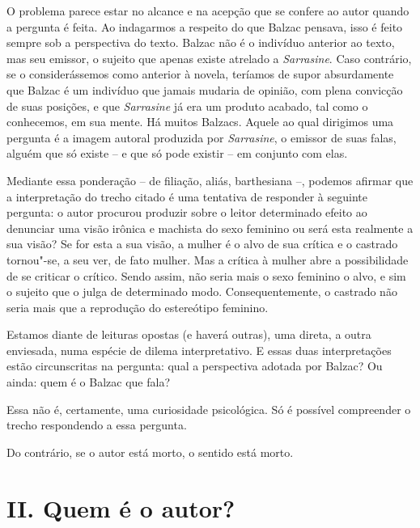 O problema parece estar no alcance e na acepção que se confere ao autor
quando a pergunta é feita. Ao indagarmos a respeito do que Balzac
pensava, isso é feito sempre sob a perspectiva do texto. Balzac não é o
indivíduo anterior ao texto, mas seu emissor, o sujeito que apenas
existe atrelado a \emph{Sarrasine}. Caso contrário, se o considerássemos como
anterior à novela, teríamos de supor absurdamente que Balzac é um
indivíduo que jamais mudaria de opinião, com plena convicção de suas
posições, e que \emph{Sarrasine} já era um produto acabado, tal como o
conhecemos, em sua mente. Há muitos Balzacs. Aquele ao qual dirigimos
uma pergunta é a imagem autoral produzida por \emph{Sarrasine}, o emissor de
suas falas, alguém que só existe -- e que só pode existir -- em conjunto
com elas.

Mediante essa ponderação -- de filiação, aliás, barthesiana --, podemos
afirmar que a interpretação do trecho citado é uma tentativa de
responder à seguinte pergunta: o autor procurou produzir sobre o leitor
determinado efeito ao denunciar uma visão irônica e machista do sexo
feminino ou será esta realmente a sua visão? Se for esta a sua visão, a
mulher é o alvo de sua crítica e o castrado tornou"-se, a seu ver, de
fato mulher. Mas a crítica à mulher abre a possibilidade de se criticar
o crítico. Sendo assim, não seria mais o sexo feminino o alvo, e sim o
sujeito que o julga de determinado modo. Consequentemente, o castrado
não seria mais que a reprodução do estereótipo feminino.

Estamos diante de leituras opostas (e haverá outras), uma direta, a
outra enviesada, numa espécie de dilema interpretativo. E essas duas
interpretações estão circunscritas na pergunta: qual a perspectiva
adotada por Balzac? Ou ainda: quem é o Balzac que fala?

Essa não é, certamente, uma curiosidade psicológica. Só é possível
compreender o trecho respondendo a essa pergunta.

Do contrário, se o autor está morto, o sentido está morto.

\section*{II. Quem é o autor?}

